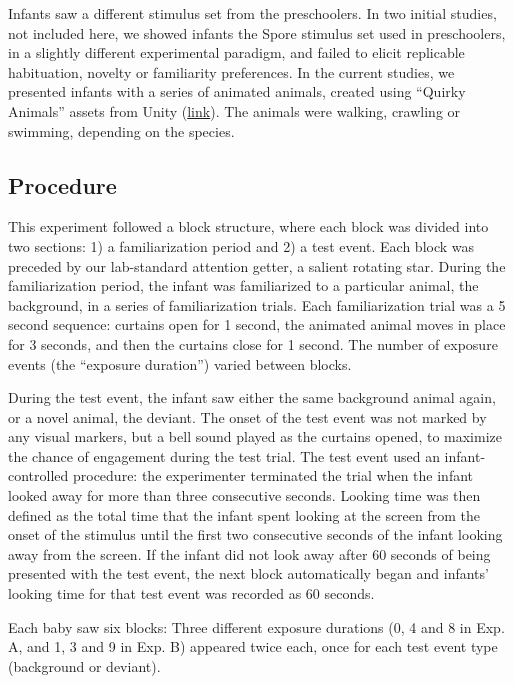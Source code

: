 \documentclass[10pt, letterpaper]{article}
\begin{document}
Infants saw a different stimulus set from the preschoolers. In two
initial studies, not included here, we showed infants the Spore stimulus
set used in preschoolers, in a slightly different experimental paradigm,
and failed to elicit replicable habituation, novelty or familiarity
preferences. In the current studies, we presented infants with a series
of animated animals, created using ``Quirky Animals'' assets from Unity
(\href{https://tinyurl.com/469xxrn7}{link}). The animals were walking,
crawling or swimming, depending on the species.

\hypertarget{procedure}{%
\subsection{Procedure}\label{procedure}}

This experiment followed a block structure, where each block was divided
into two sections: 1) a familiarization period and 2) a test event. Each
block was preceded by our lab-standard attention getter, a salient
rotating star. During the familiarization period, the infant was
familiarized to a particular animal, the background, in a series of
familiarization trials. Each familiarization trial was a 5 second
sequence: curtains open for 1 second, the animated animal moves in place
for 3 seconds, and then the curtains close for 1 second. The number of
exposure events (the ``exposure duration'') varied between blocks.

During the test event, the infant saw either the same background animal
again, or a novel animal, the deviant. The onset of the test event was
not marked by any visual markers, but a bell sound played as the
curtains opened, to maximize the chance of engagement during the test
trial. The test event used an infant-controlled procedure: the
experimenter terminated the trial when the infant looked away for more
than three consecutive seconds. Looking time was then defined as the
total time that the infant spent looking at the screen from the onset of
the stimulus until the first two consecutive seconds of the infant
looking away from the screen. If the infant did not look away after 60
seconds of being presented with the test event, the next block
automatically began and infants' looking time for that test event was
recorded as 60 seconds.

Each baby saw six blocks: Three different exposure durations (0, 4 and 8
in Exp. A, and 1, 3 and 9 in Exp. B) appeared twice each, once for each
test event type (background or deviant).
\end{document}
